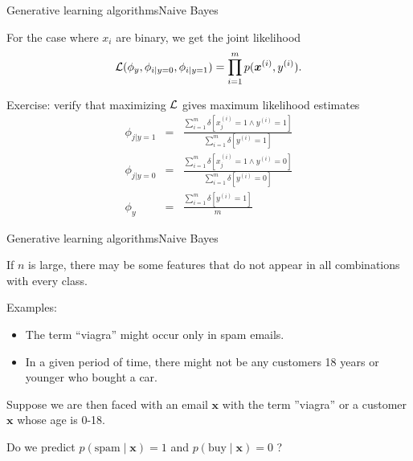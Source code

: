 \documentclass{beamer}
\renewcommand{\vec}[1]{\boldsymbol{#1}}
\begin{document}
\begin{frame}{Generative learning algorithms}{Naive Bayes}

  For the case where $x_i$ are binary, we get the joint likelihood
  \[ {\cal L}(\phi_y, \phi_{i|y=0}, \phi_{i|y=1}) = \prod_{i=1}^m
  p(\vec{x}^{(i)},y^{(i)}) .\]

  \medskip

  Exercise: verify that maximizing ${\cal L}$ gives maximum likelihood
  estimates
  \begin{eqnarray}
    \phi_{j|y=1} & = &
    \frac{\sum_{i=1}^m \delta[x_j^{(i)} = 1 \wedge y^{(i)} = 1]}
         {\sum_{i=1}^m \delta[y^{(i)} = 1]} \nonumber \\
    \phi_{j|y=0} & = &
    \frac{\sum_{i=1}^m \delta[x_j^{(i)} = 1 \wedge y^{(i)} = 0]}
         {\sum_{i=1}^m \delta[y^{(i)} = 0]} \nonumber \\
    \phi_{y} & = &
    \frac{\sum_{i=1}^m \delta[y^{(i)} = 1]}
         {m} \nonumber
  \end{eqnarray}
  
\end{frame}


\begin{frame}{Generative learning algorithms}{Naive Bayes}

  If $n$ is large, there may be some features \alert{that do not appear in all
  combinations with every class}.

  \medskip

  Examples:
  \begin{itemize}
  \item The term ``viagra'' might occur only in spam emails.
  \item In a given period of time, there might not be any customers 18
    years or younger who bought a car.
  \end{itemize}

  \medskip

  Suppose we are then faced with an email $\vec{x}$ with the term
  ''viagra'' or a customer $\vec{x}$ whose age is 0-18.

  \medskip

  Do we predict $p(\text{spam} \mid \vec{x}) = 1$ and
  $p(\text{buy} \mid \vec{x}) = 0$ ?
  
\end{frame}
\end{document}
